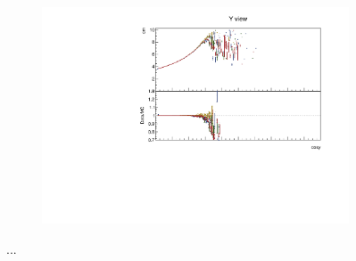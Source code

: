 \documentclass[12pt,a4paper]{article}
\begin{document}
\begin{figure}[!ht]
\begin{subfigure}{0.5\textwidth}
  \end{subfigure}
  \begin{subfigure}{0.5\textwidth}
    \includegraphics[width=\linewidth]{PlotsAngularDistribution/cm_cosy_y.pdf}
  \end{subfigure}
  \caption{...}
  \label{figAbsCalibCosY2}
\end{figure}
\end{document}
